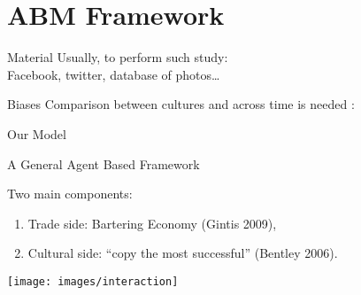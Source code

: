 \documentclass[12pt, notes=show]{beamer}
\begin{document}
\section{ABM Framework}


\begin{frame}{Material}
Usually, to perform such study:\\
	Facebook, twitter, database of photos\dots\\
	    \vspace{.5cm}
	    \begin{alertblock}{Biases} 
	Comparison between cultures and across time is needed : \\
	    \begin{center}
	    \end{center}
	
    \end{alertblock}
\end{frame}

\begin{frame}
    \centering
    \Large
    Our Model
\end{frame}

\begin{frame}{A General Agent Based Framework }

     Two main components:
     \vfill
    \begin{enumerate}
	\item Trade side: Bartering Economy (Gintis 2009),
	\item Cultural side: ``copy the most successful'' (Bentley 2006).
    \end{enumerate}
    \begin{center}
	\texttt{[image: images/interaction]}	
    \end{center}
\end{frame}
	
\end{document}
